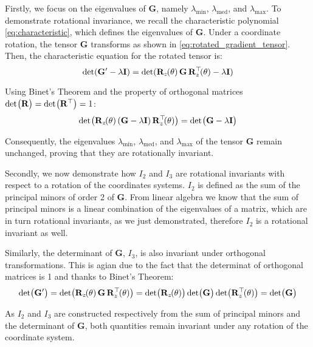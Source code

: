 \noindent
Firstly, we focus on the eigenvalues of \( \mathbf{G} \), namely 
\( \lambda_{\text{min}} \), \( \lambda_{\text{med}} \), and \( \lambda_{\text{max}} \). 
To demonstrate rotational invariance, we recall the characteristic polynomial 
\ref{eq:characteristic}, which defines the eigenvalues of \( \mathbf{G} \). 
Under a coordinate rotation, the tensor \( \mathbf{G} \) transforms as shown in 
\eqref{eq:rotated_gradient_tensor}. Then, the characteristic equation for the rotated tensor is:
\[
    \det(\mathbf{G}' - \lambda \mathbf{I}) = 
    \det(\mathbf{R}_z\mkern-2mu(\theta) \,  \mathbf{G} \, {\mathbf{R}}^\top_z\mkern-3.5mu(\theta) - \lambda \mathbf{I})
\]

\noindent
Using Binet's Theorem and the property of orthogonal matrices \( \det\mkern-2mu\big(\mathbf{R}\big) = \det\mkern-2mu\big(\mathbf{R}^\top\big) = 1 \):
\begin{equation}
    \det\mkern-2mu\big(\mathbf{R}_z\mkern-2mu(\theta) \, (\mathbf{G} - \lambda \mathbf{I}) \, {\mathbf{R}}^\top_z\mkern-3.5mu(\theta)\big) = 
    \det\mkern-2mu\big(\mathbf{G} - \lambda \mathbf{I}\big)
    \label{eq:rotational_invariance}
\end{equation}

\noindent 
Consequently, the eigenvalues \( \lambda_{\text{min}} \), \( \lambda_{\text{med}} \), 
and \( \lambda_{\text{max}} \) of the tensor \( \mathbf{G} \) remain unchanged, 
proving that they are rotationally invariant.

\noindent
Secondly, we now demonstrate how \( I_2 \) and \( I_3 \) are rotational invariants 
with respect to a rotation of the coordinates systems.
\( I_2 \) is defined as the sum of the principal minors of order 2 of \( \mathbf{G} \). 
From linear algebra we know that the sum of principal minors is a linear combination of the eigenvalues
of a matrix, which are in turn rotational invariants, as we just demonstrated, therefore \( I_2 \)
is a rotational invariant as well.

\noindent
Similarly, the determinant of \( \mathbf{G} \), \( I_3 \),
is also invariant under orthogonal transformations. 
This is agian due to the fact that the determinat of orthogonal matrices is 1 and thanks
to Binet's Theorem:
\[
\det\mkern-3mu\big(\mathbf{G}'\big) = \det\mkern-3mu\big(\mathbf{R}_z\mkern-2mu(\theta) \, \mathbf{G} \, {\mathbf{R}}^\top_z\mkern-2mu(\theta)\big) = 
\det\mkern-3mu\big(\mathbf{R}_z\mkern-2mu(\theta) \big) \det\mkern-3mu\big(\mathbf{G}\big) \det\mkern-3mu\big({\mathbf{R}}^\top_z\mkern-2mu(\theta)\big) = 
\det\mkern-3mu\big(\mathbf{G}\big)
\]

\noindent
As \( I_2 \) and \( I_3 \) are constructed respectively from the sum of principal minors 
and the determinant of \( \mathbf{G} \), both quantities remain invariant under any rotation 
of the coordinate system.















